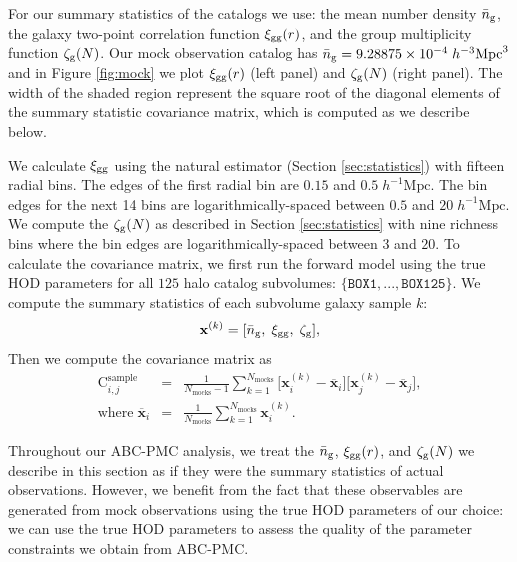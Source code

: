 \documentclass[fleqn,usenatbib]{mnras}
\newcommand{\beq}{\begin{equation}}
\newcommand{\eeq}{\end{equation}}
\begin{document}
For our summary statistics of the catalogs we use: 
the mean number density $\bar{n}_{\mathrm{g}}$, the galaxy two-point correlation function $\xi_{\mathrm{gg}}(r)$, 
and the group multiplicity function $\mathcal{\zeta}_{\rm g}(N)$. Our mock observation catalog has 
$\bar{n}_{\mathrm{g}} = 9.28875 \times 10^{-4} \;h^{-3} \mathrm{Mpc}^3$ and in Figure \ref{fig:mock} 
we plot $\xi_{\mathrm{gg}}(r)$ (left panel) and $\mathcal{\zeta}_{\rm g}(N)$ (right panel). The width of the shaded region
represent the square root of the diagonal elements of the summary statistic covariance matrix, 
which is computed as we describe below. 

We calculate $\xi_{\mathrm{gg}}$ using the natural estimator (Section \ref{sec:statistics}) with 
fifteen radial bins. The edges of the first radial bin are $0.15$ and $0.5 \; 
h^{-1}\mathrm{Mpc}$. The bin edges for the next 14 bins are logarithmically-spaced between 
$0.5$ and $20\;h^{-1}\mathrm{Mpc}$. We compute the $\mathcal{\zeta}_{\rm g}(N)$ as described in Section
\ref{sec:statistics} with nine richness bins where the bin edges are logarithmically-spaced 
between $3$ and $20$. To calculate the covariance matrix, we first run the forward model 
using the true HOD parameters for all $125$ halo catalog subvolumes: 
$\{\mathtt{BOX1}, ..., \mathtt{BOX125}\}$. 
We compute the summary statistics of each subvolume galaxy sample $k$: 
\beq
\mathbf{x}^{(k)}=[\ngalaxy, \; \xigg, \; \gmf],
\eeq
Then we compute the covariance matrix as
\begin{eqnarray} 
\mathrm{C}^\mathrm{sample}_{i,j} &=& 
\frac{1}{N_{\mathrm{mocks}}-1}\sum_{k=1}^{N_{\mathrm{mocks}}} 
\Big[\mathbf{x}^{(k)}_{i}-\overline{\mathbf{x}}_{i}\Big]
\Big[\mathbf{x}^{(k)}_{j}-\overline{\mathbf{x}}_{j}\Big], \label{eq:cov} \\
\mathrm{where} \; \overline{\mathbf{x}}_{i} &=& 
\frac{1}{N_{\mathrm{mocks}}}\sum_{k=1}^{N_{\mathrm{mocks}}} \mathbf{x}^{(k)}_{i}.
\end{eqnarray}

Throughout our ABC-PMC analysis, we treat the $\bar{n}_{\mathrm{g}}$, $\xi_{\mathrm{gg}}(r)$, and $\mathcal{\zeta}_{\rm g}(N)$ we describe in this 
section as if they were the summary statistics of actual observations. 
However, we benefit from the fact that these observables are generated from mock observations 
using the true HOD parameters of our choice: we can use the true HOD parameters to assess the 
quality of the parameter constraints we obtain from ABC-PMC. 
\end{document}
